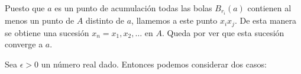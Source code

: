 \documentclass[fleqn,leqno,11pt,letterpaper,final]{article}
\begin{document}
	
	
Puesto que $a$ es un punto de acumulación todas las bolas $B_{r_i}(a)$ contienen al menos
un punto de $A$ distinto de $a$, llamemos a este punto $x_ix_j$. De esta manera se obtiene una
sucesión $x_n=x_1,x_2,\dots$ en $A$. Queda por ver que esta sucesión converge a $a$.

Sea $\epsilon>0$ un número real dado. Entonces podemos considerar dos casos:
\end{document}
